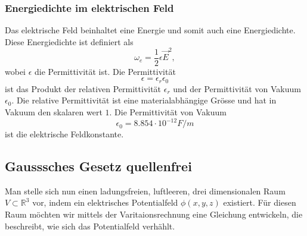 \subsubsection{Energiedichte im elektrischen Feld}
Das elektrische Feld beinhaltet eine Energie und somit auch eine Energiedichte.
Diese Energiedichte ist definiert als
\begin{equation}
\omega_e
=
\frac{1}{2} \epsilon \vec{E} ^2,
\label{maxwell:section:definiton_energiedichte_elektrischesFeld}
\end{equation}
wobei $\epsilon$ die Permittivität ist.
Die Permittivität
\[
\epsilon
=
\epsilon_r \epsilon_0
\]
ist das Produkt der relativen Permittivität $\epsilon_r$ und der Permittivität von Vakuum $\epsilon_0$.
Die relative Permittivität ist eine materialabhängige Grösse und hat in Vakuum den skalaren wert $1$.
Die Permittivität von Vakuum
\[
\epsilon_0
=
8.854 \cdot 10^{-12} F/m
\]
ist die elektrische Feldkonstante.


\subsection{Gausssches Gesetz quellenfrei
	\label{maxwell:section:elektrostatik_ohne_quelle}}
Man stelle sich nun einen ladungsfreien, luftleeren, drei dimensionalen Raum $V\subset\mathbb{R}^3$
vor, indem ein elektrisches Potentialfeld $\phi(x,y,z)$ existiert.
Für diesen Raum möchten wir mittels der Varitaionsrechnung eine Gleichung entwickeln, die beschreibt, wie sich das Potentialfeld verhählt. 

